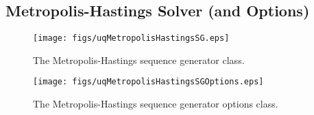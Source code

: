 \clearpage
\subsection{Metropolis-Hastings Solver (and Options)}

\begin{figure}[h!]
\centerline{
\texttt{[image: figs/uqMetropolisHastingsSG.eps]}
}
\caption{
The Metropolis-Hastings sequence generator class.
}
\label{fig-metropolis-hastings-solver-class}
\end{figure}

\begin{figure}[h!]
\begin{center}
\texttt{[image: figs/uqMetropolisHastingsSGOptions.eps]}
\end{center}
\caption{
The Metropolis-Hastings sequence generator options class.
}
\label{fig-metropolis-hastings-options-class}
\end{figure}


